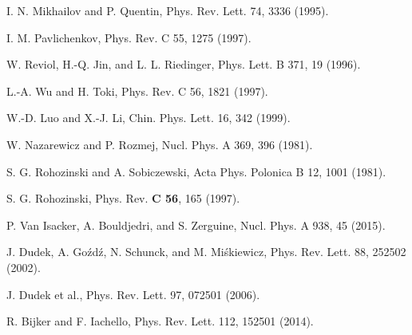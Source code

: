 \documentclass[twocolumn,prc,showpacs,preprintnumbers,superscriptaddress,floatfix]{revtex4}
\begin{document}
\begin{thebibliography}{99}
 I. N. Mikhailov and P. Quentin, Phys. Rev. Lett. 74,
3336 (1995).

 I. M. Pavlichenkov, Phys. Rev. C 55, 1275 (1997).

 W. Reviol, H.-Q. Jin, and L. L. Riedinger, Phys. Lett. B
371, 19 (1996).

 L.-A. Wu and H. Toki, Phys. Rev. C 56, 1821 (1997).

 W.-D. Luo and X.-J. Li, Chin. Phys. Lett. 16, 342 (1999).

 W. Nazarewicz and P. Rozmej, Nucl. Phys. A 369, 396
(1981).

 S. G. Rohozinski and A. Sobiczewski, Acta Phys.
Polonica B 12, 1001 (1981).

 S. G. Rohozinski, Phys. Rev. \textbf{C 56}, 165
(1997).

 P. Van Isacker, A. Bouldjedri, and S. Zerguine, Nucl.
Phys. A 938, 45 (2015).

 J. Dudek, A. Go\'zd\'z, N. Schunck, and M. Mi\'skiewicz,
Phys. Rev. Lett. 88, 252502 (2002).

 J. Dudek et al., Phys. Rev. Lett. 97, 072501 (2006).

 R. Bijker and F. Iachello, Phys. Rev. Lett. 112, 152501
(2014).
\end{thebibliography}
\end{document}
